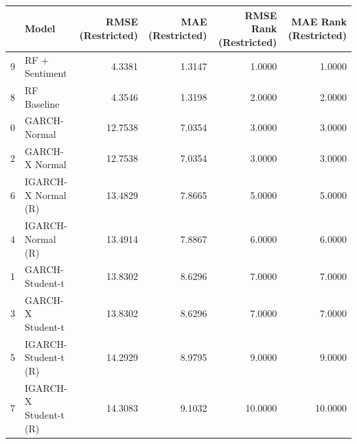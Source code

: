 \begin{table}[htbp]
\centering
\begin{tabular}{llrrrr}
\toprule
 & Model & RMSE (Restricted) & MAE (Restricted) & RMSE Rank (Restricted) & MAE Rank (Restricted) \\
\midrule
9 & RF + Sentiment & 4.3381 & 1.3147 & 1.0000 & 1.0000 \\
8 & RF Baseline & 4.3546 & 1.3198 & 2.0000 & 2.0000 \\
0 & GARCH-Normal & 12.7538 & 7.0354 & 3.0000 & 3.0000 \\
2 & GARCH-X Normal & 12.7538 & 7.0354 & 3.0000 & 3.0000 \\
6 & IGARCH-X Normal (R) & 13.4829 & 7.8665 & 5.0000 & 5.0000 \\
4 & IGARCH-Normal (R) & 13.4914 & 7.8867 & 6.0000 & 6.0000 \\
1 & GARCH-Student-t & 13.8302 & 8.6296 & 7.0000 & 7.0000 \\
3 & GARCH-X Student-t & 13.8302 & 8.6296 & 7.0000 & 7.0000 \\
5 & IGARCH-Student-t (R) & 14.2929 & 8.9795 & 9.0000 & 9.0000 \\
7 & IGARCH-X Student-t (R) & 14.3083 & 9.1032 & 10.0000 & 10.0000 \\
\bottomrule
\end{tabular}
\label{tab:robustness_restricted_window}
\end{table}
